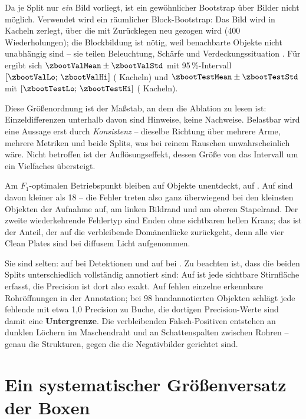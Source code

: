 Da je Split nur \emph{ein} Bild vorliegt, ist ein gewöhnlicher Bootstrap über
Bilder nicht möglich. Verwendet wird ein räumlicher Block-Bootstrap: Das Bild
wird in Kacheln zerlegt, über die mit Zurücklegen neu gezogen wird (400
Wiederholungen); die Blockbildung ist nötig, weil benachbarte Objekte nicht
unabhängig sind -- sie teilen Beleuchtung, Schärfe und Verdeckungssituation
\parencite{kuensch1989,efron1993}. Für \mAPfifty{} ergibt sich 
$\zbootValMean \pm \zbootValStd$ mit 95\,\%-Intervall
$[\zbootValLo;\,\zbootValHi]$ (\zbootValN{} Kacheln) und 
$\zbootTestMean \pm \zbootTestStd$ mit $[\zbootTestLo;\,\zbootTestHi]$
(\zbootTestN{} Kacheln).

Diese Größenordnung ist der Maßstab, an dem die Ablation zu lesen ist:
Einzeldifferenzen unterhalb davon sind Hinweise, keine Nachweise. Belastbar wird
eine Aussage erst durch \emph{Konsistenz} -- dieselbe Richtung über mehrere Arme,
mehrere Metriken und beide Splits, was bei reinem Rauschen unwahrscheinlich
wäre. Nicht betroffen ist der Auflösungseffekt, dessen Größe von
\zswValGain\PP{} das Intervall um ein Vielfaches übersteigt.

 Am $F_1$-optimalen Betriebspunkt bleiben auf
 \zfnTest{} Objekte unentdeckt, auf  \zfnVal. Auf
 sind \zfnKleinTest{} davon kleiner als 18\px{} -- die Fehler treten
also ganz überwiegend bei den kleinsten Objekten der Aufnahme auf, am linken
Bildrand und am oberen Stapelrand. Der zweite wiederkehrende Fehlertyp sind
Enden ohne sichtbaren hellen Kranz; das ist der Anteil, der auf die verbleibende
Domänenlücke zurückgeht, denn alle vier Clean Plates sind bei diffusem Licht
aufgenommen.

 Sie sind selten: \zfpTest{} auf  bei
\znPredTest{} Detektionen und \zfpVal{} auf  bei \znPredVal. Zu
beachten ist, dass die beiden Splits unterschiedlich vollständig annotiert sind:
Auf  ist jede sichtbare Stirnfläche erfasst, die Precision ist dort
also exakt. Auf  fehlen einzelne erkennbare Rohröffnungen in der
Annotation; bei 98 handannotierten Objekten schlägt jede fehlende mit etwa
1,0\PP{} Precision zu Buche, die dortigen Precision-Werte sind damit eine
\textbf{Untergrenze}. Die verbleibenden Falsch-Positiven entstehen an dunklen
Löchern im Maschendraht und an Schattenspalten zwischen Rohren -- genau die
Strukturen, gegen die die Negativbilder gerichtet sind.

\section{Ein systematischer Größenversatz der Boxen}
\label{sec:boxversatz}

